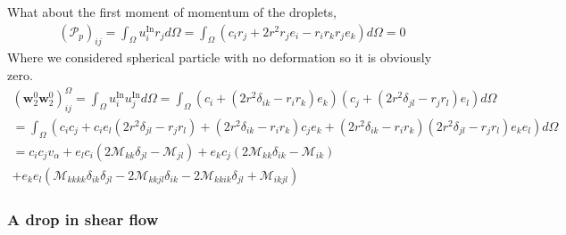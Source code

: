 What about the first moment of momentum of the droplets, 
\begin{align*}
    (\mathcal{P}_p)_{ij}
    = \int_{\Omega} 
    u_i^\text{In} r_j 
    d\Omega
    = \int_{\Omega} 
    (c_i r_j 
    + 2 r^2  r_j e_i - r_i r_k r_j e_k)
    d\Omega
    = 0 
\end{align*}
Where we considered spherical particle with no deformation so it is obviously zero.
\begin{align*}
    (\textbf{w}_2^0 \textbf{w}_2^0)_{ij}^\Omega
    = \int_{\Omega} 
    u_i^\text{In}u_j^\text{In}
    d\Omega
    = \int_{\Omega} 
    ( c_i + \left(2 r^2 \delta_{ik} - r_ir_k\right) e_k)
    ( c_j + \left(2 r^2 \delta_{jl} - r_jr_l\right) e_l)
    d\Omega\\
    = \int_{\Omega} 
    (c_i c_j + c_i e_l (2 r^2 \delta_{jl} - r_jr_l )
    + (2 r^2 \delta_{ik} - r_ir_k)c_j e_k
    +  (2 r^2 \delta_{ik} - r_ir_k)(2 r^2 \delta_{jl} - r_jr_l)e_ke_l
    )
    d\Omega\\
    = c_i c_j v_\alpha
    + e_l c_i (2 \mathcal{M}_{kk} \delta_{jl} - \mathcal{M}_{jl})
    + e_k c_j (2 \mathcal{M}_{kk} \delta_{ik} - \mathcal{M}_{ik})\\
    + e_ke_l (\mathcal{M}_{kkkk}\delta_{ik}\delta_{jl}
    -2\mathcal{M}_{kkjl}\delta_{ik}
    -2\mathcal{M}_{kkik}\delta_{jl}
    + \mathcal{M}_{ikjl}) 
\end{align*}

\subsubsection{A drop in shear flow}


